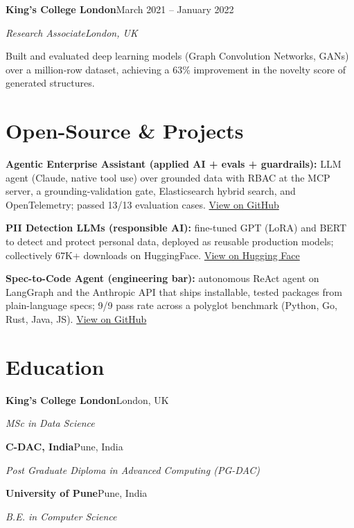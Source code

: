 \documentclass[10pt,a4paper]{article}
\newcommand{\entry}[4]{%
  {\color{company}\bfseries #1}\hfill {\color{muted}#2}\par
  \vspace{1pt}
  {\itshape #3}\hfill {\color{muted}\itshape #4}\par
  \vspace{3pt}%
}
\begin{document}
\entry{King's College London}{March 2021 -- January 2022}{Research Associate}{London, UK}
\begin{tight}
  \item Built and evaluated deep learning models (Graph Convolution Networks, GANs) over a million-row dataset, achieving a 63\% improvement in the novelty score of generated structures.
\end{tight}

\section{Open-Source \& Projects}
\begin{tight}
  \item \textbf{Agentic Enterprise Assistant (applied AI + evals + guardrails):} LLM agent (Claude, native tool use) over grounded data with RBAC at the MCP server, a grounding-validation gate, Elasticsearch hybrid search, and OpenTelemetry; passed 13/13 evaluation cases. \href{https://github.com/abhijeetscode/Agentic-Enterprise-Assistant}{View on GitHub}
  \item \textbf{PII Detection LLMs (responsible AI):} fine-tuned GPT (LoRA) and BERT to detect and protect personal data, deployed as reusable production models; collectively 67K+ downloads on HuggingFace. \href{https://huggingface.co/ab-ai/pii_model}{View on Hugging Face}
  \item \textbf{Spec-to-Code Agent (engineering bar):} autonomous ReAct agent on LangGraph and the Anthropic API that ships installable, tested packages from plain-language specs; 9/9 pass rate across a polyglot benchmark (Python, Go, Rust, Java, JS). \href{https://github.com/abhijeetscode/Spec-to-Code-Agent}{View on GitHub}
\end{tight}

\section{Education}
{\color{company}\bfseries King's College London}\hfill {\color{muted}London, UK}\par
{\itshape MSc in Data Science}\par\vspace{2pt}
{\color{company}\bfseries C-DAC, India}\hfill {\color{muted}Pune, India}\par
{\itshape Post Graduate Diploma in Advanced Computing (PG-DAC)}\par\vspace{2pt}
{\color{company}\bfseries University of Pune}\hfill {\color{muted}Pune, India}\par
{\itshape B.E. in Computer Science}\par
\end{document}
